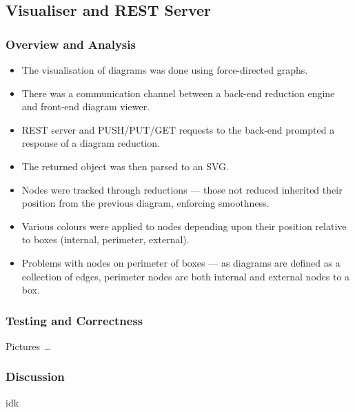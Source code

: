 \subsection{Visualiser and REST Server}\label{ssec:rest-server}

    \subsubsection{Overview and Analysis}
        \begin{itemize}
            \item The visualisation of diagrams was done using force-directed graphs.
            \item There was a communication channel between a back-end reduction engine and front-end diagram viewer.
            \item REST server and PUSH/PUT/GET requests to the back-end prompted a response of a diagram reduction.
            \item The returned object was then parsed to an SVG.
            \item Nodes were tracked through reductions --- those not reduced inherited their position from the previous diagram, enforcing smoothness.
            \item Various colours were applied to nodes depending upon their position relative to boxes (internal, perimeter, external).
            \item Problems with nodes on perimeter of boxes --- as diagrams are defined as a collection  of edges, perimeter nodes are both internal and external nodes to a box.
        \end{itemize}

    \subsubsection{Testing and Correctness}
        Pictures~\ldots

    \subsubsection{Discussion}
        idk
